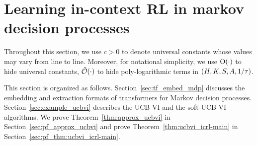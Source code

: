 \section{Learning in-context RL in markov decision processes}






















Throughout this section, we use $c>0$ to denote universal constants whose values may vary from line to line.
Moreover, for notational simplicity, we use ${\mathrm{O}}(\cdot)$ to hide universal constants,  ${\tilde{\mathcal O}}(\cdot)$ to hide poly-logarithmic terms in $({H},{K},{S},{A},1/{\tau})$. 


This section is organized as follows. Section~\ref{sec:tf_embed_mdp} discusses the embedding and extraction formats of transformers for Markov decision processes. Section~\ref{sec:example_ucbvi} describes the UCB-VI and the soft UCB-VI algorithms.  We prove Theorem~\ref{thm:approx_ucbvi} in Section~\ref{sec:pf_approx_ucbvi} and prove Theorem~\ref{thm:ucbvi_icrl-main} in Section~\ref{sec:pf_thm:ucbvi_icrl-main}. 





